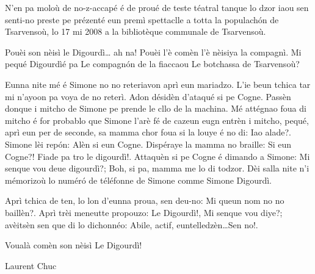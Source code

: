 {N'en pa moloù de no-z-accapé é de proué de teste téatral tanque lo dzor iaou sen senti-no preste pe prézenté eun premì spettaclle a totta la populach\'on de Tsarvensoù, lo 17 mi 2008 a la bibliotèque communale de Tsarvensoù.

Pouèi son nèisì le Digourdì… ah na! Pouèi l'è comèn l'è nèisiya la compagnì. Mi pequé \og Digourdì\fg é pa \og Le compagn\'on de la fiacca\fg ou \og Le botchassa de Tsarvensoù\fg?

Eunna nite mé é Simone no no reteriavon aprì eun mariadzo. L'ie beun tchica tar mi n'ayoon pa voya de no reterì. Adon désidèn d'ataqué si pe Cogne. Passèn donque i mitcho de Simone pe prende le cllo de la machina. Mé attégnao foua di mitcho é for probablo que Simone l'arè fé de cazeun eugn entrèn i mitcho, pequé, aprì eun per de seconde, sa mamma chor foua si la louye é no di: \og Iao alade?\fg. Simone lèi rep\'on: \og Alèn si eun Cogne\fg. Dispéraye la mamma no braille: \og Si eun Cogne?! Fiade pa tro le digourdì!\fg.
Attaquèn si pe Cogne é dimando a Simone: \og Mi senque vou deue digourdì?\fg; \og Boh, si pa, mamma me lo di todzor\fg. Dèi salla nite n'i mémorizoù lo numér\'o de téléfonne de Simone comme \og Simone Digourdì\fg.

Aprì tchica de ten, lo lon d'eunna proua, sen deu-no: \og Mi queun nom no no baillèn?\fg. Aprì trèi meneutte propouzo: \og Le Digourdì!\fg, \og Mi senque vou diye?\fg; avèitsèn sen que di lo dichonnéo: \og Abile, actif, euntelledzèn\fg\ldots \og Sen no!\fg.

Voualà comèn son nèisì Le Digourdì!}{Laurent Chuc}
